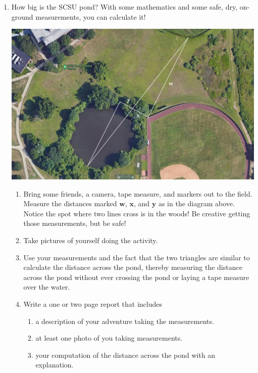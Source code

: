 \begin{enumerate}


\item How big is the SCSU pond? With some mathematics and some safe, dry, on-ground measurements, you can calculate it! 
\begin{center}
    \includegraphics[width=5.5in]{images/SCSU Pond}
\end{center}
\begin{enumerate}
\item Bring some friends, a camera, tape measure, and markers out to the field. Measure the distances marked $\mathbf w$, $\mathbf x$, and $\mathbf y$ as in the diagram above. Notice the spot where two lines cross is in the woods! Be creative getting those measurements, but be safe!
\item Take pictures of yourself doing the activity.
\item Use your measurements and the fact that the two triangles are similar to calculate the distance across the pond, thereby measuring the distance across the pond without ever crossing the pond or laying a tape measure over the water.
\item Write a one or two page report that includes
\begin{enumerate}
    \item a description of your adventure taking the measurements.
    \item at least one photo of you taking measurements.
    \item your computation of the distance across the pond with an explanation.
\end{enumerate}
\end{enumerate}
\wbnewpage



\end{enumerate}
